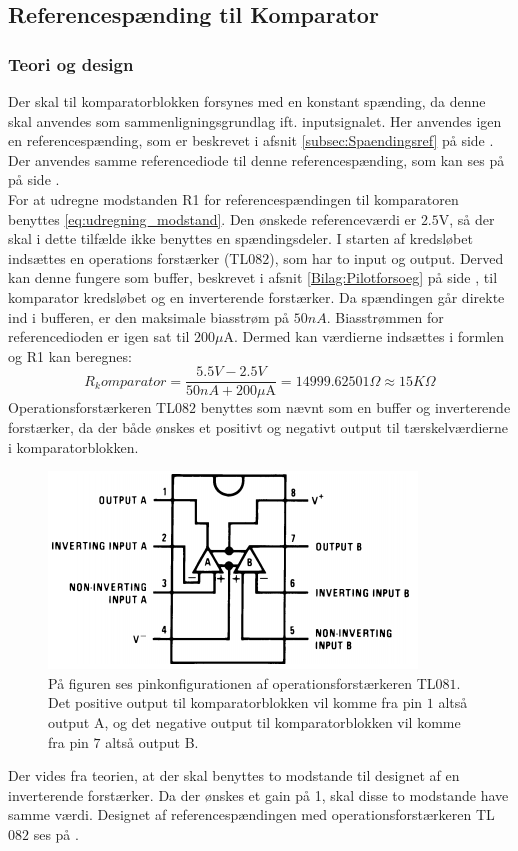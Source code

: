 \subsection{Referencespænding til Komparator}\label{subsec:Spaendingsref_Komparator}
\subsubsection{Teori og design}
Der skal til komparatorblokken forsynes med en konstant spænding, da denne skal anvendes som sammenligningsgrundlag ift. inputsignalet. Her anvendes igen en referencespænding, som er beskrevet i afsnit \ref{subsec:Spaendingsref} på side \pageref{subsec:Spaendingsref}. Der anvendes samme referencediode til denne referencespænding, som kan ses på  på side \pageref{subsec:Spaendingsref}. \\
For at udregne modstanden R1 for referencespændingen til komparatoren benyttes \eqref{eq:udregning_modstand}. Den ønskede referenceværdi er $2.5$V, så der skal i dette tilfælde ikke benyttes en spændingsdeler. I starten af kredsløbet indsættes en operations forstærker (TL$082$), som har to input og output. Derved kan denne fungere som buffer, beskrevet i afsnit \ref{Bilag:Pilotforsoeg} på side \pageref{Bilag:Pilotforsoeg}, til komparator kredsløbet og en inverterende forstærker.\cite{Schaumann2014} Da spændingen går direkte ind i bufferen, er den maksimale biasstrøm på $50nA$. Biasstrømmen for referencedioden er igen sat til $200\mu$A. Dermed kan værdierne indsættes i formlen og R1 kan beregnes:
\begin{equation}
R_komparator = \frac{5.5V-2.5V}{50nA + 200\mu\text{A}} = 14999.62501\Omega \approx 15K\Omega 
\end{equation} 
Operationsforstærkeren TL$082$ benyttes som nævnt som en buffer og inverterende forstærker, da der både ønskes et positivt og negativt output til tærskelværdierne i komparatorblokken.
\begin{figure}[H]
	\centering
	\includegraphics[scale=0.65]{figures/cProblemloesning/TL082.PNG}
	\caption{På figuren ses pinkonfigurationen af operationsforstærkeren TL$081$. Det positive output til komparatorblokken vil komme fra pin $1$ altså output A, og det negative output til komparatorblokken vil komme fra pin $7$ altså output B.}
	\label{fig:TL082}
\end{figure}
\noindent Der vides fra teorien, at der skal benyttes to modstande til designet af en inverterende forstærker. Da der ønskes et gain på 1, skal disse to modstande have samme værdi. \cite{Nilsson2011} Designet af referencespændingen med operationsforstærkeren TL$082$ ses på .

